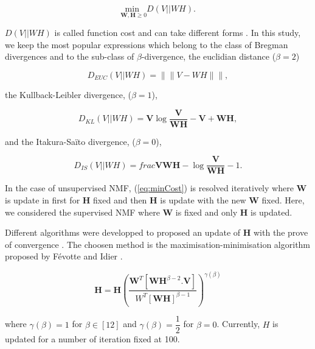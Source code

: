 \documentclass{article}
\begin{document}
\begin{sloppy}
\begin{equation}\label{eq:minCost}
\underset{\mathbf{W},\mathbf{H} \geq 0}{\text{min }} D(V\vert\vert WH).
\end{equation}

$D(V\vert\vert WH)$ is called function cost and can take different forms \cite{amari2010}. In this study, we keep the most popular expressions which belong to the class of Bregman divergences and to the sub-class of $\beta$-divergence, the euclidian distance ($\beta = 2$)

\begin{equation}\label{eq:distEUC}
D_{EUC}(V\vert\vert WH) = \|\| V- WH \|\|, 
\end{equation} 

the Kullback-Leibler divergence, ($\beta = 1$), 

\begin{equation}\label{eq:divKL}
D_{KL}(V\vert\vert WH) = \mathbf{V}\log\frac{\mathbf{V}}{\mathbf{WH}}-\mathbf{V}+\mathbf{WH},
\end{equation}

and the Itakura-Saïto divergence, ($\beta = 0$), 
 
\begin{equation}\label{eq:divIS}
D_{IS}(V\vert\vert WH) = frac{\mathbf{V}}{\mathbf{WH}} -\log\frac{\mathbf{V}}{\mathbf{WH}}-1.
\end{equation}

In the case of unsupervised NMF, (\ref{eq:minCost}) is resolved iteratively where $\mathbf{W}$ is update in first for $\mathbf{H}$ fixed and then $\mathbf{H}$ is update with the new $\mathbf{W}$ fixed. Here, we considered the supervised NMF where $\mathbf{W}$ is fixed and only $\mathbf{H}$ is updated.

Different algorithms were developped to proposed an update of $\mathbf{H}$ with the prove of convergence \cite{lee2001} \cite{amari2011}. The choosen method is the maximisation-minimisation algorithm proposed by F\'{e}votte and Idier \cite{fevotte2011}.

\begin{equation}
\mathbf{H} = \mathbf{H}\left(\frac{\mathbf{W}^T\left[\mathbf{WH}^{\beta-2}.\mathbf{V} \right]}{W^T \left[ \mathbf{WH} \right]^{\beta-1}}\right)^{\gamma(\beta)}
\end{equation}

where $\gamma(\beta) = 1$ for $\beta \in [1 2]$ and $\gamma(\beta) = \dfrac{1}{2}$ for $\beta = 0$. Currently, $H$ is updated for a number of iteration fixed at 100.


\end{sloppy}
\end{document}
